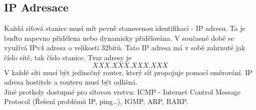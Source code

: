   \subsection{IP Adresace}
    Každá síťová stanice musí mít pevně stanovenou identifikaci - IP adresu.
    Ta je buďto napevno přidělena nebo dynamicky přidělována.
    V současné době se využívá IPv4 adresa o velikosti 32bitů.
    Tato IP adresa má v sobě zahrnuté jak číslo sítě, tak číslo stanice.
    Tvar adresy je \[XXX.XXX.XXX.XXX\]
    V každé síti musí být jedinečný router, který síť propojuje pomocí směrování. IP adresa hostitele a routeru musí být odlišná.\\
    Jiné protkoly dostupné pro síťovou vrstvu: ICMP - Internet Control Message Protocol (Řešení problémů IP, ping\dots), IGMP, ARP, RARP.